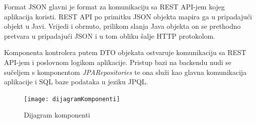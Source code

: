 			Format JSON glavni je format za komunikaciju sa REST API-jem kojeg aplikacija koristi.
			REST API po primitku JSON objekta mapira ga u pripadajući objekt u Javi. Vrijedi i obrnuto, prilikom slanja Java objekta on se prethodno pretvara u pripadajući JSON i u tom obliku šalje HTTP protokolom.
			
			
			Komponenta kontrolera putem DTO objekata ostvaruje komunikaciju sa REST API-jem i poslovnom logikom aplikacije.
			Pristup bazi na backendu nudi se sučeljem s komponentom \textit{JPARepositories} 
			te ona služi kao glavna komunikacija aplikacije i SQL baze podataka u jeziku JPQL.
			
			 \begin{figure}[h]
			 	\texttt{[image: dijagramKomponenti]}
			 	\caption{Dijagram komponenti}
			 \end{figure} 
			